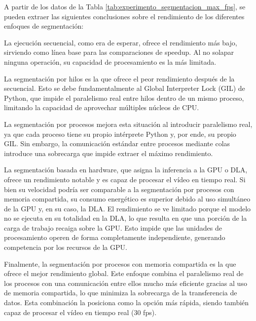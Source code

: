 \documentclass[11pt,spanish,listoffigures,listoftables]{tfgetsinf}
\begin{document}

A partir de los datos de la Tabla \ref{tab:experimento_segmentacion_max_fps}, se pueden extraer las siguientes conclusiones sobre el rendimiento de los diferentes enfoques de segmentación:

La ejecución secuencial, como era de esperar, ofrece el rendimiento más bajo, sirviendo como línea base para las comparaciones de speedup. Al no solapar ninguna operación, su capacidad de procesamiento es la más limitada.

La segmentación por hilos es la que ofrece el peor rendimiento después de la secuencial. Esto se debe fundamentalmente al Global Interpreter Lock (GIL) de Python, que impide el paralelismo real entre hilos dentro de un mismo proceso, limitando la capacidad de aprovechar múltiples núcleos de CPU.

La segmentación por procesos mejora esta situación al introducir paralelismo real, ya que cada proceso tiene su propio intérprete Python y, por ende, su propio GIL. Sin embargo, la comunicación estándar entre procesos mediante colas introduce una sobrecarga que impide extraer el máximo rendimiento.

La segmentación basada en hardware, que asigna la inferencia a la GPU o DLA, ofrece un rendimiento notable y es capaz de procesar el vídeo en tiempo real. Si bien su velocidad podría ser comparable a la segmentación por procesos con memoria compartida, su consumo energético es superior debido al uso simultáneo de la GPU y, en su caso, la DLA. El rendimiento se ve limitado porque el modelo no se ejecuta en su totalidad en la DLA, lo que resulta en que una porción de la carga de trabajo recaiga sobre la GPU. Esto impide que las unidades de procesamiento operen de forma completamente independiente, generando competencia por los recursos de la GPU.

Finalmente, la segmentación por procesos con memoria compartida es la que ofrece el mejor rendimiento global. Este enfoque combina el paralelismo real de los procesos con una comunicación entre ellos mucho más eficiente gracias al uso de memoria compartida, lo que minimiza la sobrecarga de la transferencia de datos. Esta combinación la posiciona como la opción más rápida, siendo también capaz de procesar el vídeo en tiempo real (30 fps).
\end{document}
